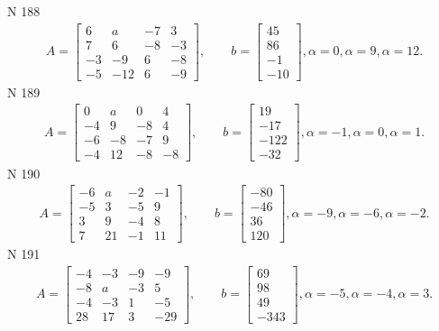 \documentclass[11pt]{report}
\begin{document}
N 188
\begin{align*}
 A = \left[\begin{matrix}6 & a & -7 & 3\\7 & 6 & -8 & -3\\-3 & -9 & 6 & -8\\-5 & -12 & 6 & -9\end{matrix}\right],
    \qquad b = \left[\begin{matrix}45\\86\\-1\\-10\end{matrix}\right], \alpha = 0, \alpha = 9, \alpha = 12. 
 \end{align*}
N 189
\begin{align*}
 A = \left[\begin{matrix}0 & a & 0 & 4\\-4 & 9 & -8 & 4\\-6 & -8 & -7 & 9\\-4 & 12 & -8 & -8\end{matrix}\right],
    \qquad b = \left[\begin{matrix}19\\-17\\-122\\-32\end{matrix}\right], \alpha = -1, \alpha = 0, \alpha = 1. 
 \end{align*}
N 190
\begin{align*}
 A = \left[\begin{matrix}-6 & a & -2 & -1\\-5 & 3 & -5 & 9\\3 & 9 & -4 & 8\\7 & 21 & -1 & 11\end{matrix}\right],
    \qquad b = \left[\begin{matrix}-80\\-46\\36\\120\end{matrix}\right], \alpha = -9, \alpha = -6, \alpha = -2. 
 \end{align*}
N 191
\begin{align*}
 A = \left[\begin{matrix}-4 & -3 & -9 & -9\\-8 & a & -3 & 5\\-4 & -3 & 1 & -5\\28 & 17 & 3 & -29\end{matrix}\right],
    \qquad b = \left[\begin{matrix}69\\98\\49\\-343\end{matrix}\right], \alpha = -5, \alpha = -4, \alpha = 3. 
 \end{align*}
\end{document}
